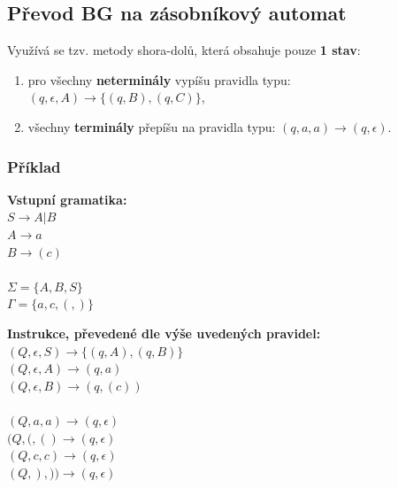 \subsection{Převod BG na zásobníkový automat}
Využívá se tzv. metody shora-dolů, která obsahuje pouze \textbf{1 stav}:
\begin{enumerate}
\item pro všechny \textbf{neterminály} vypíšu pravidla typu: $(q, \epsilon, A) \rightarrow \{(q, B), (q, C)\}$,
\item všechny \textbf{terminály} přepíšu na pravidla typu: $(q, a, a) \rightarrow (q, \epsilon)$.
\end{enumerate}

\subsubsection*{Příklad}
\begin{minipage}[t]{0.35\textwidth}
\textbf{Vstupní gramatika:}\\
$S \rightarrow A | B$\\
$A \rightarrow a$\\
$B \rightarrow (c)$\\\smallskip\\
$\Sigma = \{A, B, S\}$\\
$\Gamma = \{a, c, (, )\}$
\end{minipage}
\begin{minipage}[t]{0.65\textwidth}
\textbf{Instrukce, převedené dle výše uvedených pravidel:}\\
$(Q, \epsilon, S) \rightarrow \{(q, A), (q, B)\}$\\
$(Q, \epsilon, A) \rightarrow (q, a)$\\
$(Q, \epsilon, B) \rightarrow (q, (c))$\\\smallskip\\
$(Q, a, a) \rightarrow (q, \epsilon)$\\
$(Q, (, () \rightarrow (q, \epsilon)$\\
$(Q, c, c) \rightarrow (q, \epsilon)$\\
$(Q, ), )) \rightarrow (q, \epsilon)$\\
\end{minipage}